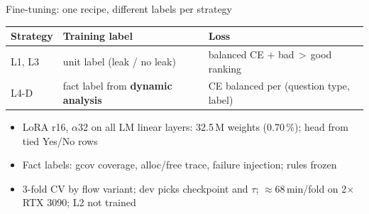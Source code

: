 \begin{frame}{Fine-tuning: one recipe, different labels per strategy}
  \centering
  \vspace{2pt}

  \small
  \renewcommand{\arraystretch}{1.1}
  \begin{tabular}{@{}lll@{}}
    \toprule
    Strategy & Training label & Loss \\
    \midrule
    L1, L3 & unit label (leak / no leak) & balanced CE + bad\,$>$\,good ranking \\
    L4-D & fact label from \textbf{dynamic analysis} & CE balanced per (question type, label) \\
    \bottomrule
  \end{tabular}
  \vspace{2pt}
  \begin{itemize}\small
    \item LoRA r16, $\alpha$32 on all LM linear layers: 32.5\,M weights (0.70\,\%); head from tied Yes/No rows
    \item Fact labels: gcov coverage, alloc/free trace,  failure injection; rules frozen
    \item 3-fold CV by flow variant; dev picks checkpoint and $\tau$; $\approx$68\,min/fold on 2$\times$ RTX 3090; L2 not trained
  \end{itemize}
\end{frame}
